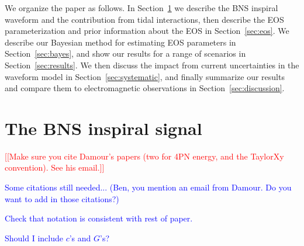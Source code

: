 \documentclass[twocolumn,prd,amssymb,aps,nofootinbib,showpacs,epsf]{revtex4}
\newcommand{\red}{\textcolor{red}}
\newcommand\les[2]{\textcolor{blue}{{#1}\sout{#2}}}
\begin{document}
We organize the paper as follows. In Section~\ref{sec:waveform} we describe the BNS inspiral waveform and the contribution from tidal interactions, then describe the EOS parameterization and prior information about the EOS in Section~\ref{sec:eos}. We describe our Bayesian method for estimating EOS parameters in Section~\ref{sec:bayes}, and show our results for a range of scenarios in Section~\ref{sec:results}. We then discuss the impact from current uncertainties in the waveform model in Section~\ref{sec:systematic}, and finally summarize our results and compare them to electromagnetic observations in Section~\ref{sec:discussion}.


\section{The BNS inspiral signal}
\label{sec:waveform}

\red{[[Make sure you cite Damour's papers (two for 4PN energy, and the TaylorXy convention). See his email.]]}

\les{Some citations still needed...  (Ben, you mention an email from Damour.  Do you want to add in those citations?)}{}

\les{Check that notation is consistent with rest of paper.}{}

\les{Should I include $c$'s and $G$'s?}{}
\end{document}
